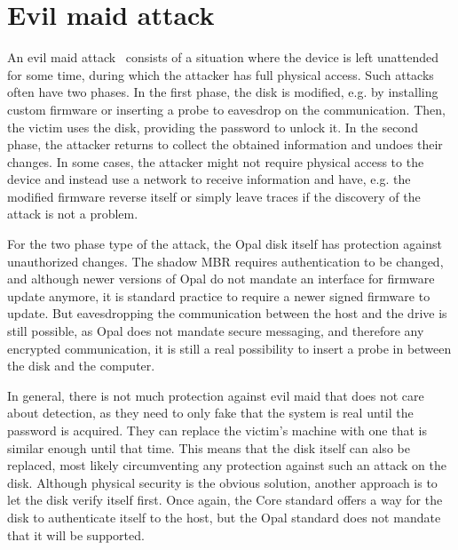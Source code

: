 

\section{Evil maid attack}

An evil maid attack~\cite{self_decrypting_risks,systematic_assessment_of_the_security} consists of a situation where the device is left unattended for some time, during which the attacker has full physical access. Such attacks often have two phases. In the first phase, the disk is modified, e.g. by installing custom firmware or inserting a probe to eavesdrop on the communication. Then, the victim uses the disk, providing the password to unlock it. In the second phase, the attacker returns to collect the obtained information and undoes their changes. In some cases, the attacker might not require physical access to the device and instead use a network to receive information and have, e.g. the modified firmware reverse itself or simply leave traces if the discovery of the attack is not a problem.

\REPLACEME

For the two phase type of the attack, the Opal disk itself has protection against unauthorized changes. The shadow MBR requires authentication to be changed, and although newer versions of Opal do not mandate an interface for firmware update anymore, it is standard practice to require a newer signed firmware to update.
But eavesdropping the communication between the host and the drive is still possible, as Opal does not mandate secure messaging, and therefore any encrypted communication, it is still a real possibility to insert a probe in between the disk and the computer.



In general, there is not much protection against evil maid that does not care about detection, as they need to only fake that the system is real until the password is acquired. They can replace the victim's machine with one that is similar enough until that time. This means that the disk itself can also be replaced, most likely circumventing any protection against such an attack on the disk.
Although physical security is the obvious solution, another approach is to let the disk verify itself first. Once again, the Core standard offers a way for the disk to authenticate itself to the host, but the Opal standard does not mandate that it will be supported.


